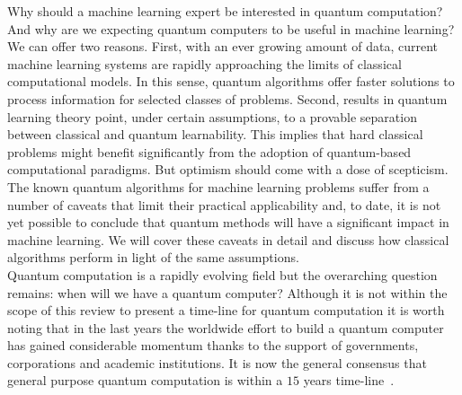 \documentclass[a4paper, 11pt]{article}
\begin{document}
Why should a machine learning expert be interested in quantum computation? And why are we expecting quantum computers to be useful in machine learning? We can offer two reasons. First, with an ever growing amount of data, current machine learning systems are rapidly approaching the limits of classical computational models. In this sense, quantum algorithms offer faster solutions to process information for selected classes of problems. Second, results in quantum learning theory point, under certain assumptions, to a provable separation between classical and quantum learnability. This implies that hard classical problems might benefit significantly from the adoption of quantum-based computational paradigms. But optimism should come with a dose of scepticism. The known quantum algorithms for machine learning problems suffer from a number of caveats that limit their practical applicability and, to date, it is not yet possible to conclude that quantum methods will have a significant impact in machine learning. We will cover these caveats in detail and discuss how classical algorithms perform in light of the same assumptions. \\ 

Quantum computation is a rapidly evolving field but the overarching question remains: when will we have a quantum computer? Although it is not within the scope of this review to present a time-line for quantum computation it is worth noting that in the last years the worldwide effort to build a quantum computer has gained considerable momentum thanks to the support of governments, corporations and academic institutions. It is now the general consensus that general purpose
quantum computation is within a $15$ years time-line~\cite{de2016quantum}.\\
\end{document}
